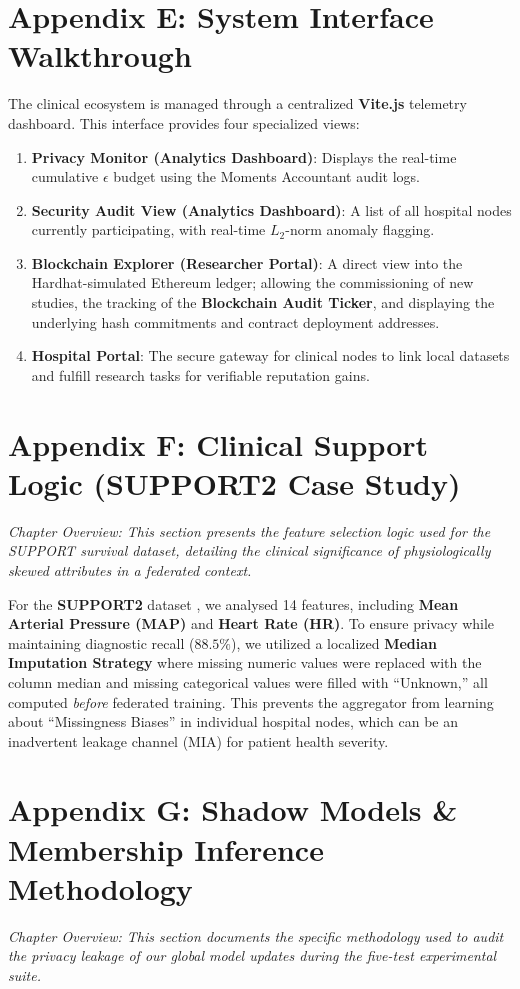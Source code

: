 \documentclass[10pt, a4paper, twocolumn]{article}
\begin{document}
\section*{Appendix E: System Interface Walkthrough}
The clinical ecosystem is managed through a centralized \textbf{Vite.js} telemetry dashboard. This interface provides four specialized views:
\begin{enumerate}
    \item \textbf{Privacy Monitor (Analytics Dashboard)}: Displays the real-time cumulative $\epsilon$ budget using the Moments Accountant audit logs.
    \item \textbf{Security Audit View (Analytics Dashboard)}: A list of all hospital nodes currently participating, with real-time $L_2$-norm anomaly flagging.
    \item \textbf{Blockchain Explorer (Researcher Portal)}: A direct view into the Hardhat-simulated Ethereum ledger; allowing the commissioning of new studies, the tracking of the \textbf{Blockchain Audit Ticker}, and displaying the underlying hash commitments and contract deployment addresses.
    \item \textbf{Hospital Portal}: The secure gateway for clinical nodes to link local datasets and fulfill research tasks for verifiable reputation gains.
\end{enumerate}

\section*{Appendix F: Clinical Support Logic (SUPPORT2 Case Study)}
\textit{Chapter Overview: This section presents the feature selection logic used for the SUPPORT survival dataset, detailing the clinical significance of physiologically skewed attributes in a federated context.}

For the \textbf{SUPPORT2} dataset \cite{knaus1995}, we analysed 14 features, including \textbf{Mean Arterial Pressure (MAP)} and \textbf{Heart Rate (HR)}. To ensure privacy while maintaining diagnostic recall ($88.5\%$), we utilized a localized \textbf{Median Imputation Strategy} where missing numeric values were replaced with the column median and missing categorical values were filled with ``Unknown,'' all computed \textit{before} federated training. This prevents the aggregator from learning about ``Missingness Biases'' in individual hospital nodes, which can be an inadvertent leakage channel (MIA) for patient health severity.

\section*{Appendix G: Shadow Models \& Membership Inference Methodology}
\textit{Chapter Overview: This section documents the specific methodology used to audit the privacy leakage of our global model updates during the five-test experimental suite.}
\end{document}
